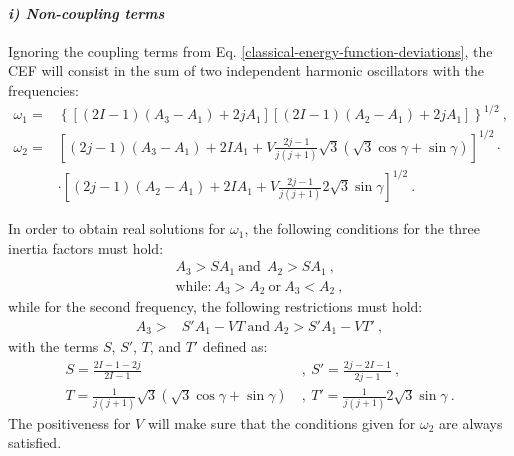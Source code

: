 \paragraph*{\textit{i) Non-coupling terms}}
Ignoring the coupling terms from Eq. \ref{classical-energy-function-deviations}, the CEF will consist in the sum of two independent harmonic oscillators with the frequencies:
\begin{align}
    \omega_1=&\left\{\left[(2I-1)(A_3-A_1)+2jA_1\right]\left[(2I-1)(A_2-A_1)+2jA_1\right]\right\}^{1/2}\ ,\nonumber\\
    \omega_2=&\left[(2j-1)(A_3-A_1)+2IA_1+V\frac{2j-1}{j(j+1)}\sqrt{3}\left(\sqrt{3}\cos\gamma+\sin\gamma\right)\right]^{1/2}\cdot\nonumber\\
    &\cdot\left[(2j-1)(A_2-A_1)+2IA_1+V\frac{2j-1}{j(j+1)}2\sqrt{3}\sin\gamma\right]^{1/2}\ .
    \label{small-omega-1-2}
\end{align}

In order to obtain real solutions for $\omega_1$, the following conditions for the three inertia factors must hold:
\begin{align}
    A_3>SA_1\ \text{and}\ \ A_2>SA_1\ ,\nonumber\\
    \text{while:}\ A_3>A_2\ \text{or}\ A_3<A_2\ ,
\end{align}
while for the second frequency, the following restrictions must hold:
\begin{align}
    A_3>&S'A_1-VT\ \text{and}\ A_2>S'A_1-VT'\ ,\nonumber
\end{align}
with the terms $S$, $S'$, $T$, and $T'$ defined as:
\begin{align}
    S=\frac{2I-1-2j}{2I-1}\ &,\  S'=\frac{2j-2I-1}{2j-1}\ ,\nonumber\\
    T=\frac{1}{j(j+1)}\sqrt{3}\left(\sqrt{3}\cos\gamma+\sin\gamma\right)\ &,\ T'=\frac{1}{j(j+1)}2\sqrt{3}\sin\gamma\ .
\end{align}
The positiveness for $V$ will make sure that the conditions given for $\omega_2$ are always satisfied.

